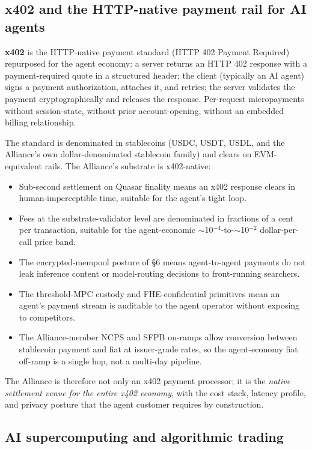 \subsection{x402 and the HTTP-native payment rail for AI agents}

\textbf{x402} is the HTTP-native payment standard (HTTP 402 Payment
Required) repurposed for the agent economy: a server returns an HTTP
402 response with a payment-required quote in a structured header; the
client (typically an AI agent) signs a payment authorization, attaches
it, and retries; the server validates the payment cryptographically
and releases the response. Per-request micropayments without
session-state, without prior account-opening, without an embedded
billing relationship.

The standard is denominated in stablecoins (USDC, USDT, USDL, and the
Alliance's own dollar-denominated stablecoin family) and clears on
EVM-equivalent rails. The Alliance's substrate is x402-native:

\begin{itemize}[leftmargin=2em,itemsep=0.1em]
\item Sub-second settlement on Quasar finality means an x402 response
clears in human-imperceptible time, suitable for the agent's tight
loop.
\item Fees at the substrate-validator level are denominated in
fractions of a cent per transaction, suitable for the agent-economic
$\sim$10$^{-4}$-to-$\sim$10$^{-2}$ dollar-per-call price band.
\item The encrypted-mempool posture of \S 6 means agent-to-agent
payments do not leak inference content or model-routing decisions to
front-running searchers.
\item The threshold-MPC custody and FHE-confidential primitives mean
an agent's payment stream is auditable to the agent operator without
exposing to competitors.
\item The Alliance-member NCPS and SFPB on-ramps allow conversion
between stablecoin payment and fiat at issuer-grade rates, so the
agent-economy fiat off-ramp is a single hop, not a multi-day pipeline.
\end{itemize}

The Alliance is therefore not only an x402 payment processor; it is
the \emph{native settlement venue for the entire x402 economy}, with
the cost stack, latency profile, and privacy posture that the agent
customer requires by construction.

\subsection{AI supercomputing and algorithmic trading}

